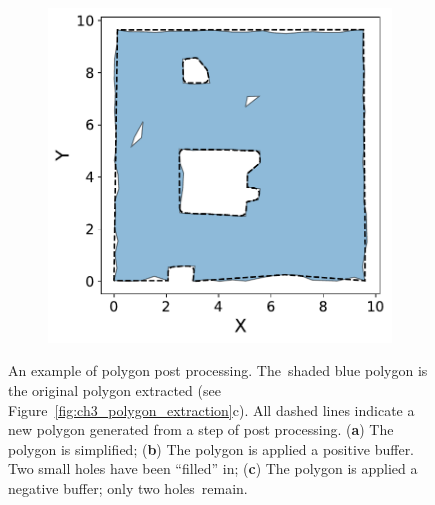 \begin{figure}[H]
\begin{subfigure}[t]{.30\linewidth}
    \caption{\label{fig:ch3_polygon_post_b}}
  \end{subfigure}
  \hfill
  \begin{subfigure}[t]{.30\linewidth}
    \centering\includegraphics[clip,trim=0cm 0cm 0cm 0cm,width=.99\linewidth]{chapter_3_polylidar3d/imgs/polygon/PolygonExtraction_e.pdf}
    \caption{\label{fig:ch3_polygon_post_c}}
  \end{subfigure}
  \caption{An example of polygon post processing. The~shaded blue polygon is the original polygon extracted (see Figure~\ref{fig:ch3_polygon_extraction}c). All dashed lines indicate a new polygon generated from a step of post processing. (\textbf{a}) The polygon is simplified; (\textbf{b}) The polygon is applied a positive buffer. Two small holes have been ``filled'' in; (\textbf{c}) The polygon is applied a negative buffer; only two holes~remain. }\label{fig:ch3_polygon_post}
\end{figure}
\unskip





